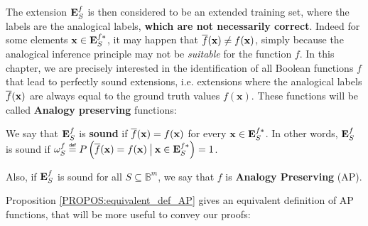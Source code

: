 \noindent
The extension $\mathbf{E}_{S}^{f}$ is then considered to be an extended training set, where
the labels are the analogical labels, \textbf{which are not necessarily
correct}. Indeed
for some elements $\mathbf{x} \in \mathbf{E}_{S}^{f*}$, it may happen that
$\overline{f}(\mathbf{x}) \neq f(\mathbf{x})$, simply because the analogical inference
principle may not be \textit{suitable} for the function $f$. In this chapter,
we  are precisely interested in the identification of all Boolean functions $f$
that lead to perfectly sound extensions, i.e. extensions where the analogical
labels $\overline{f}(\mathbf{x})$ are always equal to the ground truth values
$f(\mathbf{x})$. These functions will be called \textbf{Analogy preserving}
functions:

\begin{definition}
  We say that $\mathbf{E}_{S}^{f}$ is {\bf sound} if
  $\overline{f}(\mathbf{x})=f(\mathbf{x})$ for every $\mathbf{x} \in
  \mathbf{E}_{S}^{f*}$. In other words, $\mathbf{E}_{S}^{f}$ is sound if $\omegasf
  \eqdef P\left(\albl{\mathbf{x}} = f(\mathbf{x}) \given[\big] \mathbf{x} \in
  \esfs\right) = 1$.

  \noindent
  Also, if $\mathbf{E}_{S}^{f}$ is sound for all $S \subseteq
  \mathbb{B}^m$, we say that $f$ is {\bf Analogy Preserving} (AP).
\end{definition}

\noindent
Proposition \ref{PROPOS:equivalent_def_AP} gives an equivalent definition of AP
functions, that will be more useful to convey our proofs:

